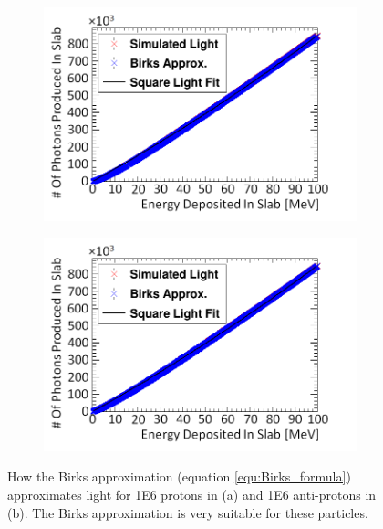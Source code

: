 \begin{figure}[htbp]
\centering
\begin{subfigure}{.5\textwidth}
  \centering
  \includegraphics[width=\linewidth]{Appendix5/newNewFigs/protonBirksSlab_simAndApproxLight.png}
  \captionsetup{width=.9\linewidth}
  \caption{}
  \label{subfig:append5_light_of_protons0-100mev}
\end{subfigure}%
\begin{subfigure}{.5\textwidth}
  \centering
  \includegraphics[width=\linewidth]{Appendix5/newNewFigs/aProtonBirksSlab_simAndApproxLight.png}
  \captionsetup{width=.9\linewidth}
  \caption{}
  \label{subfig:append5_light_of_Aprotons0-100mev}
\end{subfigure}
\caption[Birks' light approximation for proton particles compared to simulation.]{How the Birks approximation (equation \ref{equ:Birks_formula}) approximates light for 1E6 protons in (a) and 1E6 anti-protons in (b). The Birks approximation is very suitable for these particles.}
\label{fig:append5_light_of_protons_Aprotons0-100mev}
\end{figure}


